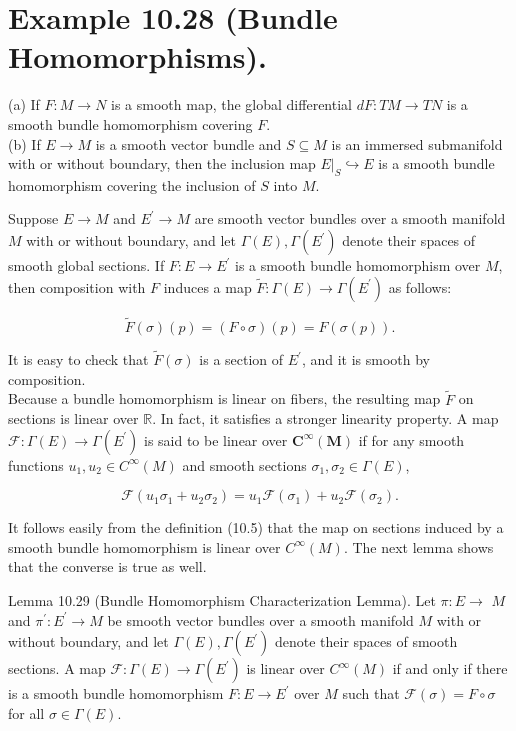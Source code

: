 \documentclass[10pt]{article}
\begin{document}
\section*{Example 10.28 (Bundle Homomorphisms).}
(a) If $F: M \rightarrow N$ is a smooth map, the global differential $d F: T M \rightarrow T N$ is a smooth bundle homomorphism covering $F$.\\
(b) If $E \rightarrow M$ is a smooth vector bundle and $S \subseteq M$ is an immersed submanifold with or without boundary, then the inclusion map $\left.E\right|_{S} \hookrightarrow E$ is a smooth bundle homomorphism covering the inclusion of $S$ into $M$.

Suppose $E \rightarrow M$ and $E^{\prime} \rightarrow M$ are smooth vector bundles over a smooth manifold $M$ with or without boundary, and let $\Gamma(E), \Gamma\left(E^{\prime}\right)$ denote their spaces of smooth global sections. If $F: E \rightarrow E^{\prime}$ is a smooth bundle homomorphism over $M$, then composition with $F$ induces a map $\widetilde{F}: \Gamma(E) \rightarrow \Gamma\left(E^{\prime}\right)$ as follows:

$$
\tilde{F}(\sigma)(p)=(F \circ \sigma)(p)=F(\sigma(p)) .
$$

It is easy to check that $\widetilde{F}(\sigma)$ is a section of $E^{\prime}$, and it is smooth by composition.\\
Because a bundle homomorphism is linear on fibers, the resulting map $\widetilde{F}$ on sections is linear over $\mathbb{R}$. In fact, it satisfies a stronger linearity property. A map $\mathcal{F}: \Gamma(E) \rightarrow \Gamma\left(E^{\prime}\right)$ is said to be linear over $\boldsymbol{C}^{\infty}(\boldsymbol{M})$ if for any smooth functions $u_{1}, u_{2} \in C^{\infty}(M)$ and smooth sections $\sigma_{1}, \sigma_{2} \in \Gamma(E)$,

$$
\mathscr{F}\left(u_{1} \sigma_{1}+u_{2} \sigma_{2}\right)=u_{1} \mathscr{F}\left(\sigma_{1}\right)+u_{2} \mathscr{F}\left(\sigma_{2}\right) .
$$

It follows easily from the definition (10.5) that the map on sections induced by a smooth bundle homomorphism is linear over $C^{\infty}(M)$. The next lemma shows that the converse is true as well.

Lemma 10.29 (Bundle Homomorphism Characterization Lemma). Let $\pi: E \rightarrow$ $M$ and $\pi^{\prime}: E^{\prime} \rightarrow M$ be smooth vector bundles over a smooth manifold $M$ with or without boundary, and let $\Gamma(E), \Gamma\left(E^{\prime}\right)$ denote their spaces of smooth sections. A map $\mathscr{F}: \Gamma(E) \rightarrow \Gamma\left(E^{\prime}\right)$ is linear over $C^{\infty}(M)$ if and only if there is a smooth bundle homomorphism $F: E \rightarrow E^{\prime}$ over $M$ such that $\mathcal{F}(\sigma)=F \circ \sigma$ for all $\sigma \in \Gamma(E)$.
\end{document}
